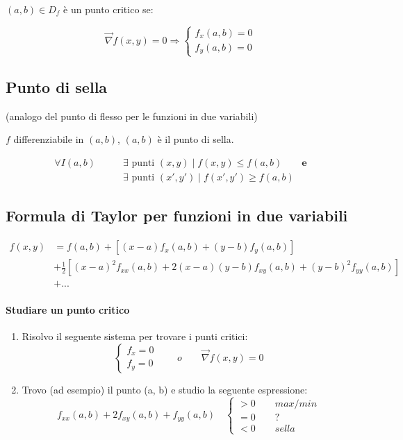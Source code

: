 \documentclass[10pt,a4paper,fleqn]{article}
\begin{document}
	$(a, b) \in D_f$ è un punto critico se:
	
	\begin{equation}
		\vec \nabla f(x,y) = 0 \Rightarrow
		\begin{cases}
			f_x(a, b) = 0 \\
			f_y(a, b) = 0
		\end{cases}
	\end{equation}

	\subsection{Punto di sella} (analogo del punto di flesso per le funzioni in due variabili)

	$f$ differenziabile in $(a, b)$, $(a, b)$ è il punto di sella.
	
	\begin{equation}
	\begin{split}
	\forall I(a, b) \qquad &\exists \text{ punti } (x, y) \mid f(x, y) \leq f(a, b)\qquad \mathbf{e}\\
	&\exists \text{ punti } (x', y') \mid f(x', y') \geq f(a, b)
	\end{split}
	\end{equation}
	
	\subsection{Formula di Taylor per funzioni in due variabili}

	\begin{equation}
	\begin{split}
	f(x, y) &= f(a, b) + \left[(x-a)f_x(a, b) + (y-b)f_y(a, b) \right]\\ &+ \frac{1}{2}\left[(x-a)^2 f_{xx}(a, b) + 2(x-a)(y-b)f_{xy}(a, b) + (y-b)^2 f_{yy}(a, b)\right]\\ &+ ...
	\end{split}
	\end{equation}
	\paragraph{Studiare un punto critico}
	\begin{enumerate}
	\item Risolvo il seguente sistema per trovare i punti critici:
		\begin{equation}
			\begin{cases}
			f_x=0 \\ f_y=0
			\end{cases}
			\qquad o \qquad \vec{\nabla}f(x,y)=0
		\end{equation}
	\item Trovo (ad esempio) il punto (a, b) e studio la seguente espressione:
	\begin{equation}
	f_{xx}(a,b) + 2f_{xy}(a,b) + f_{yy}(a,b) \quad
	\begin{cases}
	> 0 \qquad \textit{max/min} \\ = 0 \qquad ? \\ < 0 \qquad \textit{sella}
	\end{cases}
	\end{equation}
	\end{enumerate}
\end{document}
